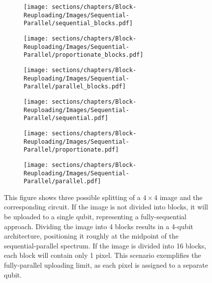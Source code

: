 \begin{figure}
    \centering
    \begin{subfigure}[b]{0.3\textwidth}
        \centering
        \texttt{[image: sections/chapters/Block-Reuploading/Images/Sequential-Parallel/sequential\_blocks.pdf]}
        \label{fig:sequential-block}
    \end{subfigure}
    \hfill
    \begin{subfigure}[b]{0.3\textwidth}
        \centering
        \texttt{[image: sections/chapters/Block-Reuploading/Images/Sequential-Parallel/proportionate\_blocks.pdf]}
        \label{fig:prop-block}
    \end{subfigure}
    \hfill
    \begin{subfigure}[b]{0.3\textwidth}
        \centering
        \texttt{[image: sections/chapters/Block-Reuploading/Images/Sequential-Parallel/parallel\_blocks.pdf]}
        \label{fig:parallel-block}
    \end{subfigure}
    \hfill
    \begin{subfigure}[b]{0.3\textwidth}
        \centering
        \texttt{[image: sections/chapters/Block-Reuploading/Images/Sequential-Parallel/sequential.pdf]}
        \label{fig:sequential-circ}
    \end{subfigure}
    \hfill
    \begin{subfigure}[b]{0.3\textwidth}
        \centering
        \texttt{[image: sections/chapters/Block-Reuploading/Images/Sequential-Parallel/proportionate.pdf]}
        \label{fig:prop-circ}
    \end{subfigure}
    \hfill
    \begin{subfigure}[b]{0.3\textwidth}
        \centering
        \texttt{[image: sections/chapters/Block-Reuploading/Images/Sequential-Parallel/parallel.pdf]}
        \label{fig:parallel-circ}
    \end{subfigure}
    \caption{This figure shows three possible splitting of a $4\times4$ image and the corresponding 
    circuit. 
    If the image is not divided into blocks, it will be uploaded to a single qubit, 
    representing a fully-sequential approach. 
    Dividing the image into 4 blocks results in a 4-qubit architecture, 
    positioning it roughly at the midpoint of the sequential-parallel spectrum.
    If the image is divided into 16 blocks, each block will contain only 1 pixel. 
    This scenario exemplifies the fully-parallel uploading limit, as each pixel is assigned to 
    a separate qubit.}
    \label{fig:three-splitting}
\end{figure}



